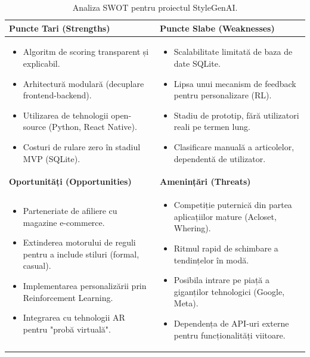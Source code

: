 \begin{table}[h]
    \centering
    \begin{tabular}{|p{}|p{}|}
    \hline
    \textbf{Puncte Tari (Strengths)} & \textbf{Puncte Slabe (Weaknesses)} \\ \hline
    \begin{itemize}
        \item Algoritm de scoring transparent și explicabil.
        \item Arhitectură modulară (decuplare frontend-backend).
        \item Utilizarea de tehnologii open-source (Python, React Native).
        \item Costuri de rulare zero în stadiul MVP (SQLite).
    \end{itemize} & 
    \begin{itemize}
        \item Scalabilitate limitată de baza de date SQLite.
        \item Lipsa unui mecanism de feedback pentru personalizare (RL).
        \item Stadiu de prototip, fără utilizatori reali pe termen lung.
        \item Clasificare manuală a articolelor, dependentă de utilizator.
    \end{itemize} \\
    \hline
    \textbf{Oportunități (Opportunities)} & \textbf{Amenințări (Threats)} \\ \hline
    \begin{itemize}
        \item Parteneriate de afiliere cu magazine e-commerce.
        \item Extinderea motorului de reguli pentru a include stiluri (formal, casual).
        \item Implementarea personalizării prin Reinforcement Learning.
        \item Integrarea cu tehnologii AR pentru "probă virtuală".
    \end{itemize} &
    \begin{itemize}
        \item Competiție puternică din partea aplicațiilor mature (Acloset, Whering).
        \item Ritmul rapid de schimbare a tendințelor în modă.
        \item Posibila intrare pe piață a giganților tehnologici (Google, Meta).
        \item Dependența de API-uri externe pentru funcționalități viitoare.
    \end{itemize} \\
    \hline
    \end{tabular}
    \caption{Analiza SWOT pentru proiectul StyleGenAI.}
    \label{tab:swot_analysis}
\end{table}

